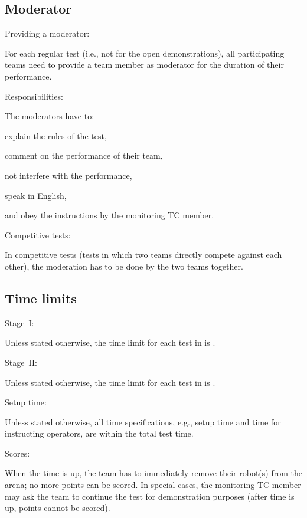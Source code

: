 \subsection{Moderator}
\label{rule:moderator}
\begin{enumerate}
	{\bf\item Providing a moderator:} For each regular test (i.e., not for the open demonstrations), all participating teams need to provide a team member as moderator for the duration of their performance. 
	{\bf\item Responsibilities:} The moderators have to:
	\begin{compactitem}
		\item explain the rules of the test, 
		\item comment on the performance of their team, 
		\item not interfere with the performance, 
		\item speak in English, 
		\item and obey the instructions by the monitoring TC member.
	\end{compactitem}
	{\bf\item Competitive tests:} In competitive tests (tests in which two teams directly compete against each other), the moderation has to be done by the two teams together.
\end{enumerate}


\subsection{Time limits}
\label{rule:time_limits}
\begin{enumerate}
	{\bf\item Stage~I:} Unless stated otherwise, the time limit for each test in  is .
	{\bf\item Stage~II:} Unless stated otherwise, the time limit for each test in  is .
	{\bf\item Setup time:} Unless stated otherwise, all time specifications, e.g., setup time and time for instructing operators, are within the total test time. 
	{\bf\item Scores:} When the time is up, the team has to immediately remove their robot(s) from the arena; no more points can be scored. In special cases, the monitoring TC member may ask the team to continue the test for demonstration purposes (after time is up, points cannot be scored). 
\end{enumerate}




